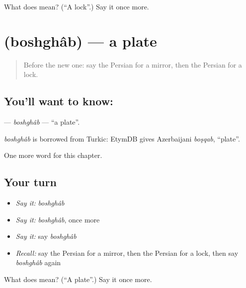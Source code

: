 \begin{tcolorbox}[breakable,colback=teal!4,colframe=teal!35!black,title={Before you move on}]
What does  mean? (\textquotedblleft{}A lock\textquotedblright{}.) Say it once more.
\end{tcolorbox}
\section[\texorpdfstring{\fa{بشقاب} (boshghâb)}{بشقاب (boshghâb)}]{ (boshghâb) — a plate}

\label{lesson:FA-C47-boshghab}



\begin{quote}
Before the new one: say the Persian for a mirror, then the Persian for a lock.
\end{quote}

\subsection*{You'll want to know: }
\textbf{} — \emph{boshghâb} — \textquotedblleft{}a plate\textquotedblright{}.

\begin{cousinweb}
\emph{boshghâb} is borrowed from Turkic: EtymDB gives Azerbaijani \emph{boşqab}, \textquotedblleft{}plate\textquotedblright{}.
\end{cousinweb}

\begin{grammarlens}[title={What you've built}]
One more word for this chapter.
\end{grammarlens}

\subsection*{Your turn}
\begin{itemize}
\raggedright
  \item \emph{Say it:} \emph{boshghâb}
  \item \emph{Say it:} \emph{boshghâb}, once more
  \item \emph{Say it:} say \emph{boshghâb}
  \item \emph{Recall:} say the Persian for a mirror, then the Persian for a lock, then say \emph{boshghâb} again
\end{itemize}

\begin{tcolorbox}[breakable,colback=teal!4,colframe=teal!35!black,title={Before you move on}]
What does  mean? (\textquotedblleft{}A plate\textquotedblright{}.) Say it once more.
\end{tcolorbox}
